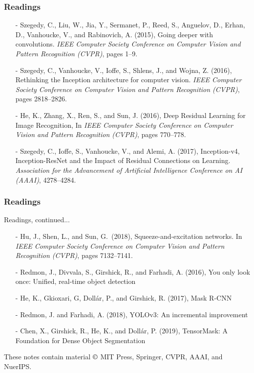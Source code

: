 \documentclass[aspectratio=169]{beamer}
\begin{document}
\begin{frame}
\frametitle{Readings}

\begin{itemize}
\item[-] Szegedy, C., Liu, W., Jia, Y., Sermanet, P., Reed, S.,
  Anguelov, D., Erhan, D., Vanhoucke, V., and Rabinovich, A. (2015),
  Going deeper with convolutions.  \textit{IEEE Computer Society
    Conference on Computer Vision and Pattern Recognition (CVPR)},
  pages 1--9.
\item[-] Szegedy, C., Vanhoucke, V., Ioffe, S., Shlens, J., and Wojna,
  Z. (2016), Rethinking the Inception architecture for computer
  vision. \textit{IEEE Computer Society Conference on Computer Vision
    and Pattern Recognition (CVPR)}, pages 2818--2826.
\item[-] He, K., Zhang, X., Ren, S., and Sun, J. (2016), Deep Residual
  Learning for Image Recognition, In \textit{IEEE Computer Society
    Conference on Computer Vision and Pattern Recognition (CVPR)},
  pages 770--778.
\item[-] Szegedy, C., Ioffe, S., Vanhoucke, V., and Alemi, A. (2017),
  Inception-v4, Inception-ResNet and the Impact of Residual
  Connections on Learning. \textit{Association for the Advancement of
    Artificial Intelligence Conference on AI (AAAI)}, 4278--4284.
\end{itemize}

\end{frame}


\begin{frame}
\frametitle{Readings}

Readings, continued...
\begin{itemize}
\item[-] Hu, J., Shen, L., and Sun, G.\ (2018), Squeeze-and-excitation
  networks.  In \textit{IEEE Computer Society Conference on Computer
    Vision and Pattern Recognition (CVPR)}, pages 7132--7141.
\item[-] Redmon, J., Divvala, S., Girshick, R., and Farhadi, A. (2016),
  You only look once: Unified, real-time object detection
\item[-] He, K., Gkioxari, G, Dollár, P., and Girshick, R. (2017),
  Mask R-CNN
\item[-] Redmon, J. and Farhadi, A. (2018), YOLOv3: An incremental
  improvement
\item[-] Chen, X., Girshick, R., He, K., and Dollár, P. (2019),
  TensorMask: A Foundation for Dense Object Segmentation
\end{itemize}

These notes contain material $\copyright$ MIT Press, Springer,
CVPR, AAAI, and NuerIPS.

\end{frame}
\end{document}
